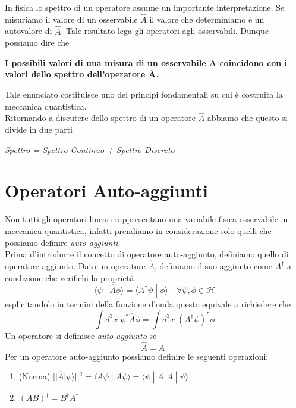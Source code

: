 \noindent In fisica lo spettro di un operatore assume un importante interpretazione. Se misuriamo il valore di un osservabile $\hat{A}$ il valore che determiniamo \`e un autovalore di $\hat{A}$. Tale risultato lega gli operatori agli osservabili. Dunque possiamo dire che 
\begin{center}
\textbf{I possibili valori di una misura di un osservabile A coincidono con i valori dello spettro dell'operatore $\hat{\bold{A}}$.}	
\end{center}
Tale enunciato costituisce uno dei principi fondamentali su cui \`e costruita la meccanica quantistica.
\\

\noindent Ritornando a discutere dello spettro  di un operatore $\hat{A}$ abbiamo che questo si divide in due parti
\begin{center}
	\textit{Spettro = Spettro Continuo + Spettro Discreto}
\end{center}

\section{Operatori Auto-aggiunti}

Non tutti gli operatori lineari rappresentano una variabile fisica osservabile  in meccanica quantistica, infatti prendiamo in considerazione solo quelli che possiamo definire \textit{auto-aggiunti}.
\\

\noindent Prima d'introdurre il concetto di operatore auto-aggiunto, definiamo quello di operatore aggiunto. Dato un operatore $\hat{A}$, definiamo il suo aggiunto come $A^\dag$ a condizione che verifichi la propriet\`a
\begin{equation*}
	\langle \psi \; | \; \hat{A} \phi \rangle = \langle A^\dag \psi \; | \; \phi \rangle 
	\quad \forall \psi,\phi \in \mathcal{H}
\end{equation*}
esplicitandolo in termini della funzione d'onda questo equivale a richiedere che
\begin{equation*}
	\int d^3x \; \psi^*\hat{A}\phi = \int d^3x \; (A^\dag\psi)^*\phi
\end{equation*}
Un operatore si definisce \textit{auto-aggiunto} se 
\begin{equation*}
	\hat{A} = A^\dag
\end{equation*}
Per un operatore auto-aggiunto possiamo definire le seguenti operazioni:
\begin{enumerate}
	\item (Norma) $||\hat{A}|\psi \rangle ||^2 =\langle A\psi \; | \; A \psi \rangle = \langle \psi \; |\; A^\dag A \;|\;\psi \rangle $
	\item $(AB)^\dag = B^\dag A^\dag$
\end{enumerate}

